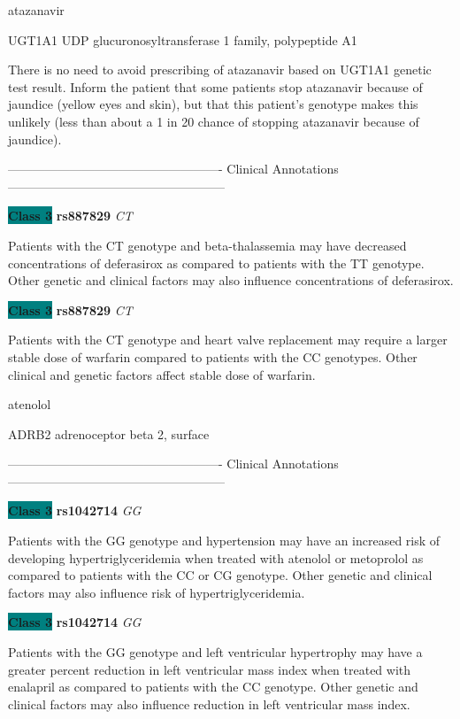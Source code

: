 \documentclass{resume} %
\begin{document}
\begin{rSection}{ atazanavir }
\begin{rSubsection}{ UGT1A1 }{ UDP glucuronosyltransferase 1 family, polypeptide A1 }{}{}
\item[] There is no need to avoid prescribing of atazanavir based on UGT1A1 genetic test result. Inform the patient that some patients stop atazanavir because of jaundice (yellow eyes and skin), but that this patient’s genotype makes this unlikely (less than about a 1 in 20 chance of stopping atazanavir because of jaundice).
\item[] ---------------------------------------------------- Clinical Annotations -----------------------------------------------------\newline
\item \textbf{\colorbox{teal} {Class 3}} \textbf{ rs887829 } \textit{ CT }
\item[] Patients with the CT genotype and beta-thalassemia may have decreased concentrations of deferasirox as compared to patients with the TT genotype. Other genetic and clinical factors may also influence concentrations of deferasirox.\item \textbf{\colorbox{teal} {Class 3}} \textbf{ rs887829 } \textit{ CT }
\item[] Patients with the CT genotype and heart valve replacement may require a larger stable dose of warfarin compared to patients with the CC genotypes. Other clinical and genetic factors affect stable dose of warfarin.
\end{rSubsection}

\end{rSection}\begin{rSection}{ atenolol }
\item[]

\begin{rSubsection}{ ADRB2 }{ adrenoceptor beta 2, surface }{}{}
\item[]

\item[] ---------------------------------------------------- Clinical Annotations -----------------------------------------------------\newline
\item \textbf{\colorbox{teal} {Class 3}} \textbf{ rs1042714 } \textit{ GG }
\item[] Patients with the GG genotype and hypertension may have an increased risk of developing hypertriglyceridemia when treated with atenolol or metoprolol as compared to patients with the CC or CG genotype. Other genetic and clinical factors may also influence risk of hypertriglyceridemia. \item \textbf{\colorbox{teal} {Class 3}} \textbf{ rs1042714 } \textit{ GG }
\item[] Patients with the GG genotype and left ventricular hypertrophy may have a greater percent reduction in left ventricular mass index when treated with enalapril as compared to patients with the CC genotype. Other genetic and clinical factors may also influence reduction in left ventricular mass index. 
\end{rSubsection}


\end{rSection}
\end{document}
